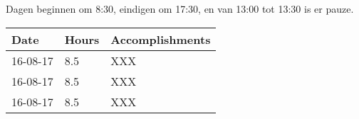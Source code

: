 Dagen beginnen om 8:30, eindigen om 17:30, en van 13:00 tot 13:30 is er pauze.
\begin{center}
    \begin{tabular}{ | l | l | p{9cm} |}
    \hline

    Date & Hours & Accomplishments \\ \hline
    16-08-17 & 8.5 & XXX \\ \hline
    16-08-17 & 8.5 & XXX \\ \hline
    16-08-17 & 8.5 & XXX \\ \hline

    \hline
    \end{tabular}
\end{center}